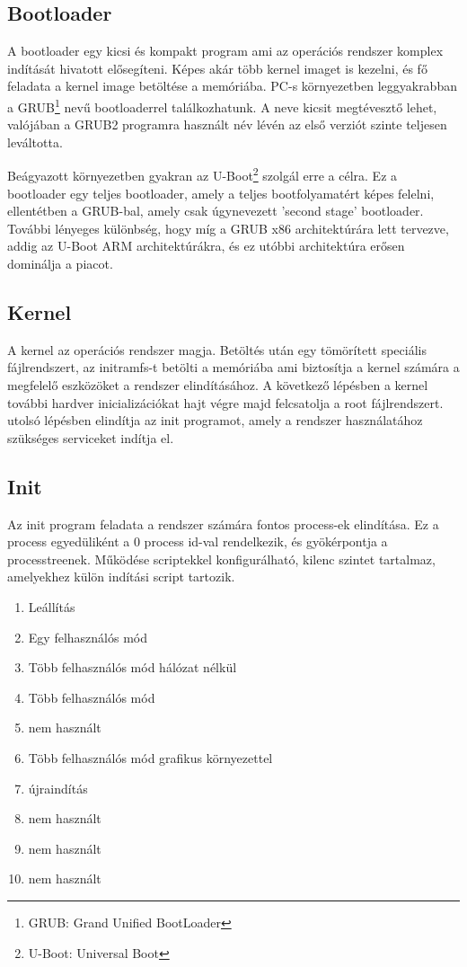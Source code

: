 \subsection{Bootloader}

A bootloader egy kicsi és kompakt program ami az operációs rendszer komplex indítását hivatott elősegíteni. Képes akár több kernel imaget is kezelni, és fő feladata a kernel image betöltése a memóriába. PC-s környezetben
leggyakrabban a GRUB\footnote{GRUB: Grand Unified BootLoader} nevű bootloaderrel találkozhatunk. A neve kicsit megtévesztő lehet, valójában a GRUB2 programra használt név lévén az első verziót szinte teljesen leváltotta.

Beágyazott környezetben gyakran az U-Boot\footnote{U-Boot: Universal Boot} szolgál erre a célra. Ez a bootloader egy teljes bootloader, amely a teljes bootfolyamatért képes felelni, ellentétben a GRUB-bal, amely csak úgynevezett
'second stage' bootloader. További lényeges különbség, hogy míg a GRUB x86 architektúrára lett tervezve, addig az U-Boot ARM architektúrákra, és ez utóbbi architektúra erősen dominálja a piacot. 

\subsection{Kernel}

A kernel az operációs rendszer magja. Betöltés után egy tömörített speciális fájlrendszert, az initramfs-t betölti a memóriába ami biztosítja a kernel számára a megfelelő eszközöket a rendszer elindításához. A következő lépésben a
kernel további hardver inicializációkat hajt végre majd felcsatolja a root fájlrendszert. utolsó lépésben elindítja az init programot, amely a rendszer használatához szükséges serviceket indítja el.

\subsection{Init}

Az init program feladata a rendszer számára fontos process-ek elindítása. Ez a process egyedüliként a 0 process id-val rendelkezik, és gyökérpontja a processtreenek. Működése scriptekkel konfigurálható, kilenc szintet tartalmaz,
amelyekhez külön indítási script tartozik.

\begin{enumerate}
  \item Leállítás
  \item Egy felhasználós mód
  \item Több felhasználós mód hálózat nélkül
  \item Több felhasználós mód
  \item nem használt
  \item Több felhasználós mód grafikus környezettel
  \item újraindítás
  \item nem használt
  \item nem használt
  \item nem használt
\end{enumerate}

